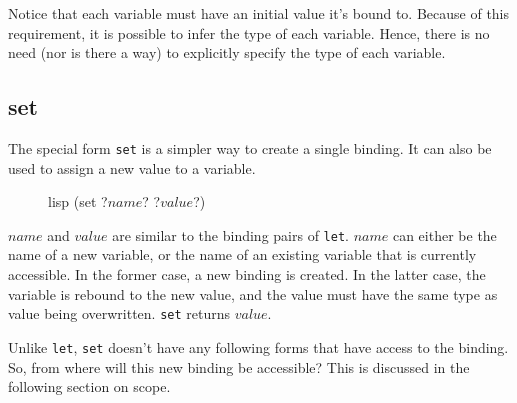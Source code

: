 Notice that each variable must have an initial value it's bound to. Because of this requirement, it is possible to infer the type of each variable. Hence, there is no need (nor is there a way) to explicitly specify the type of each variable.

\subsection{set}
The special form \texttt{set} is a simpler way to create a single binding. It can also be used to assign a new value to a variable.

\begin{figure}[htp]
    \centering
    \begin{cminted}[autogobble=true, escapeinside=??]{lisp}
        (set ?$name$? ?$value$?)
    \end{cminted}
    \captionsetup[figure]{font=small}
\end{figure}

$name$ and $value$ are similar to the binding pairs of \texttt{let}. $name$ can either be the name of a new variable, or the name of an existing variable that is currently accessible. In the former case, a new binding is created. In the latter case, the variable is rebound to the new value, and the value must have the same type as value being overwritten. \texttt{set} returns $value$.

Unlike \texttt{let}, \texttt{set} doesn't have any following forms that have access to the binding. So, from where will this new binding be accessible? This is discussed in the following section on scope.
